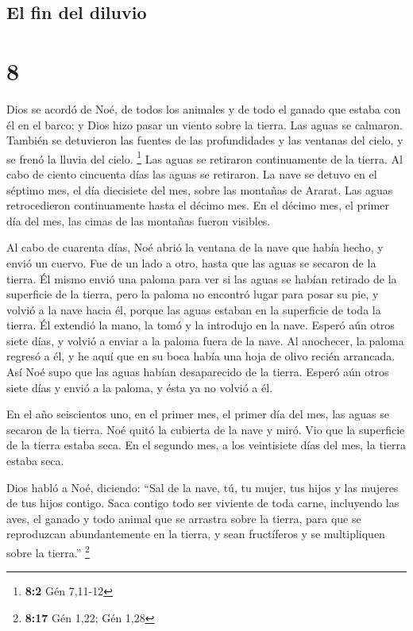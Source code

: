 \hypertarget{el-fin-del-diluvio}{%
\subsection{El fin del diluvio}\label{el-fin-del-diluvio}}

\hypertarget{section-7}{%
\section{8}\label{section-7}}

 Dios se acordó de Noé, de todos los animales y de todo el
ganado que estaba con él en el barco; y Dios hizo pasar un viento sobre
la tierra. Las aguas se calmaron.  También se detuvieron
las fuentes de las profundidades y las ventanas del cielo, y se frenó la
lluvia del cielo. \footnote{\textbf{8:2} Gén 7,11-12}  Las
aguas se retiraron continuamente de la tierra. Al cabo de ciento
cincuenta días las aguas se retiraron.  La nave se detuvo
en el séptimo mes, el día diecisiete del mes, sobre las montañas de
Ararat.  Las aguas retrocedieron continuamente hasta el
décimo mes. En el décimo mes, el primer día del mes, las cimas de las
montañas fueron visibles.

 Al cabo de cuarenta días, Noé abrió la ventana de la nave
que había hecho,  y envió un cuervo. Fue de un lado a
otro, hasta que las aguas se secaron de la tierra.  Él
mismo envió una paloma para ver si las aguas se habían retirado de la
superficie de la tierra,  pero la paloma no encontró lugar
para posar su pie, y volvió a la nave hacia él, porque las aguas estaban
en la superficie de toda la tierra. Él extendió la mano, la tomó y la
introdujo en la nave.  Esperó aún otros siete días, y
volvió a enviar a la paloma fuera de la nave.  Al
anochecer, la paloma regresó a él, y he aquí que en su boca había una
hoja de olivo recién arrancada. Así Noé supo que las aguas habían
desaparecido de la tierra.  Esperó aún otros siete días y
envió a la paloma, y ésta ya no volvió a él.

 En el año seiscientos uno, en el primer mes, el primer
día del mes, las aguas se secaron de la tierra. Noé quitó la cubierta de
la nave y miró. Vio que la superficie de la tierra estaba seca.
 En el segundo mes, a los veintisiete días del mes, la
tierra estaba seca.

 Dios habló a Noé, diciendo:  ``Sal de la
nave, tú, tu mujer, tus hijos y las mujeres de tus hijos contigo.
 Saca contigo todo ser viviente de toda carne, incluyendo
las aves, el ganado y todo animal que se arrastra sobre la tierra, para
que se reproduzcan abundantemente en la tierra, y sean fructíferos y se
multipliquen sobre la tierra.'' \footnote{\textbf{8:17} Gén 1,22; Gén
  1,28}

